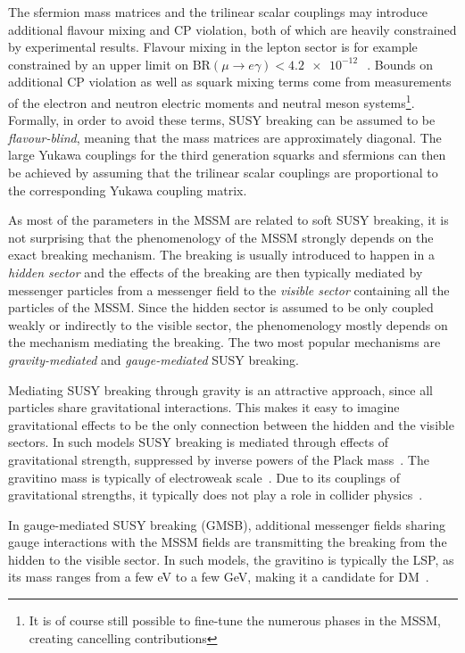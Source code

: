 The sfermion mass matrices and the trilinear scalar couplings may introduce additional flavour mixing and CP violation, both of which are heavily constrained by experimental results. Flavour mixing in the lepton sector is for example constrained by an upper limit on $\mathrm{BR}(\mu \rightarrow e\gamma) < \SI{4.2e-12}{}$~\cite{Mori:2016vwi}. Bounds on additional CP violation as well as squark mixing terms come from measurements of the electron and neutron electric moments and neutral meson systems\footnote{It is of course still possible to fine-tune the numerous phases in the MSSM, creating cancelling contributions}. Formally, in order to avoid these terms, SUSY breaking can be assumed to be \textit{flavour-blind}, meaning that the mass matrices are approximately diagonal. The large Yukawa couplings for the third generation squarks and sfermions can then be achieved by assuming that the trilinear scalar couplings are proportional to the corresponding Yukawa coupling matrix.

As most of the parameters in the MSSM are related to soft SUSY breaking, it is not surprising that the phenomenology of the MSSM strongly depends on the exact breaking mechanism. The breaking is usually introduced to happen in a \textit{hidden sector} and the effects of the breaking are then typically mediated by messenger particles from a messenger field to the \textit{visible sector} containing all the particles of the MSSM. Since the hidden sector is assumed to be only coupled weakly or indirectly to the visible sector, the phenomenology mostly depends on the mechanism mediating the breaking. The two most popular mechanisms are \textit{gravity-mediated} and \textit{gauge-mediated} SUSY breaking.

Mediating SUSY breaking through gravity is an attractive approach, since all particles share gravitational interactions. This makes it easy to imagine gravitational effects to be the only connection between the hidden and the visible sectors. In such models SUSY breaking is mediated through effects of gravitational strength, suppressed by inverse powers of the Plack mass~\cite{pdg2020}. The gravitino mass is typically of electroweak scale~\cite{Nilles:1983ge,LAHANAS19871}. Due to its couplings of gravitational strengths, it typically does not play a role in collider physics~\cite{pdg2020}.

In gauge-mediated SUSY breaking (GMSB), additional messenger fields sharing gauge interactions with the MSSM fields are transmitting the breaking from the hidden to the visible sector. In such models, the gravitino is typically the LSP, as its mass ranges from a few eV to a few GeV, making it a candidate for DM~\cite{Feng:2003xh}.

